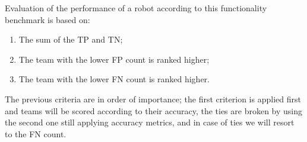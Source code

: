 Evaluation of the performance of a robot according to this functionality benchmark is based on:
%
\begin{enumerate}
\item The sum of the TP and TN;
\item The team with the lower FP count is ranked higher;
\item The team with the lower FN count is ranked higher.
\end{enumerate}
%
The previous criteria are in order of importance; the first criterion is applied first and teams will be scored according to their accuracy, the ties are broken by using the second one still applying accuracy metrics, and in case of ties we will resort to the FN count.


